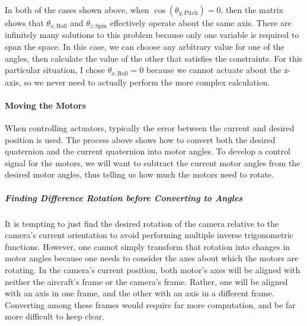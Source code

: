 \documentclass[letterpaper,10pt]{article}
\begin{document}
In both of the cases shown above, when $\cos\!\left(\theta_{y,\text{Pitch}}\right) = 0$, then the matrix shows that $\theta_{x,\text{Roll}}$ and $\theta_{z,\text{Spin}}$ effectively operate about the same axis. There are infinitely many solutions to this problem because only one variable is required to span the space. In this case, we can choose any arbitrary value for one of the angles, then calculate the value of the other that satisfies the constraints. For this particular situation, I chose $\theta_{x,\text{Roll}} = 0$ because we cannot actuate about the z-axis, so we never need to actually perform the more complex calculation.

\paragraph{Moving the Motors}
When controlling actuators, typically the error between the current and desired position is used. The process above shows how to convert both the desired quaternion and the current quaternion into motor angles. To develop a control signal for the motors, we will want to subtract the current motor angles from the desired motor angles, thus telling us how much the motors need to rotate.

\subparagraph{Finding Difference Rotation \emph{before} Converting to Angles}
It is tempting to just find the desired rotation of the camera relative to the camera's current orientation to avoid performing multiple inverse trigonometric functions. However, one cannot simply transform that rotation into changes in motor angles because one needs to consider the axes about which the motors are rotating. In the camera's current position, both motor's axes will be aligned with neither the aircraft's frame or the camera's frame. Rather, one will be aligned with an axis in one frame, and the other with an axis in a different frame. Converting among these frames would require far more computation, and be far more difficult to keep clear.
\end{document}
